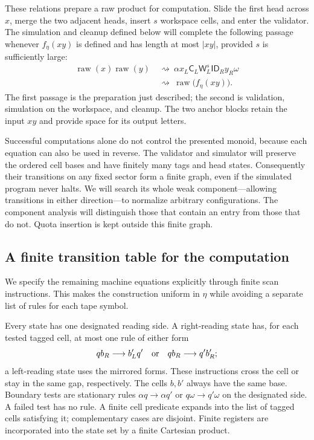 These relations prepare a raw product for computation. Slide the first
head across $x$, merge the two adjacent heads, insert $s$ workspace
cells, and enter the validator. The simulation and cleanup defined
below will complete the following passage whenever $f_\eta(xy)$ is
defined and has length at most $|xy|$, provided $s$ is sufficiently large:
\begin{equation}\label{eq:compiler-pipeline}
\begin{aligned}
\operatorname{raw}(x)\operatorname{raw}(y)
&\ \rightsquigarrow\ 
\alpha x_L\mathsf C_L\mathsf W_L^s\mathsf I\mathsf D_R y_R\omega\\
&\ \rightsquigarrow\ 
\operatorname{raw}\bigl(f_\eta(xy)\bigr).
\end{aligned}
\end{equation}
The first passage is the preparation just described; the second is
validation, simulation on the workspace, and cleanup. The two anchor
blocks retain the input $xy$ and provide space for its output letters.

Successful computations alone do not control the presented monoid,
because each equation can also be used in reverse. The validator and
simulator will preserve the ordered cell bases and have finitely many
tags and head states. Consequently their transitions on any fixed
sector form a finite graph, even if the simulated program never halts.
We will search its whole weak component---allowing transitions in
either direction---to normalize arbitrary configurations. The component
analysis will distinguish those that contain an entry from those that
do not. Quota insertion is kept outside this finite graph.

\subsection{A finite transition table for the computation}

We specify the remaining machine equations explicitly through finite
scan instructions. This makes the construction uniform in $\eta$ while
avoiding a separate list of rules for each tape symbol.

Every state has one designated reading side. A right-reading state has,
for each tested tagged cell, at most one rule of either form
\begin{equation}\label{eq:compiler-instructions}
q b_R\longrightarrow b'_Lq'
\quad\hbox{or}\quad
q b_R\longrightarrow q'b'_R;
\end{equation}
a left-reading state uses the mirrored forms. These instructions cross
the cell or stay in the same gap, respectively. The cells $b,b'$ always
have the same base. Boundary tests are stationary rules
$\alpha q\to\alpha q'$ or $q\omega\to q'\omega$ on the designated
side. A failed test has no rule. A finite cell predicate expands into
the list of tagged cells satisfying it; complementary cases are
disjoint. Finite registers are incorporated into the state set by a
finite Cartesian product.

